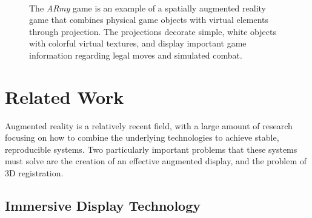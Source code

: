 \documentclass[review]{vgtc}                 %
\begin{document}
\begin{figure}[t]
%
\vspace{-0.2in}\\
\caption[Images of ARmy: A Spatially Augmented Reality Game]{ The
  \emph{ARmy} game is an example of a spatially augmented reality game
  that combines physical game objects with virtual elements through
  projection.  The projections decorate simple, white objects with
  colorful virtual textures, and display important game information
  regarding legal moves and simulated combat.  }
\label{FIGURE:GameInProgress}
\vspace{-0.15in}
\end{figure}


\section{Related Work}

Augmented reality is a relatively recent field, with a large amount of
research focusing on how to combine the underlying technologies to
achieve stable, reproducible systems.  Two particularly important
problems that these systems must solve are the creation of an
effective augmented display, and the problem of 3D registration.

\subsection{Immersive Display Technology}
\end{document}
